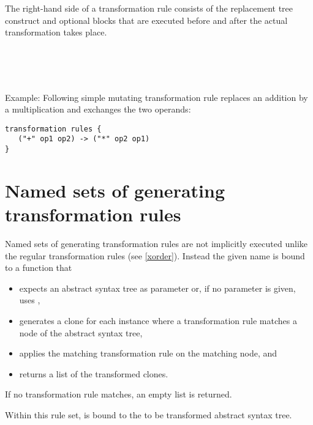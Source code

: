 \noindent
The right-hand side of a transformation rule consists of the replacement
tree construct and optional blocks that are executed before and after
the actual transformation takes place.

\begin{grammar}
      \produces {} \nextline
	  \nextline
	  \\
      \produces {} \\
      \produces {} \\
\end{grammar}

\noindent
Example: Following simple mutating transformation rule replaces
an addition by a multiplication and exchanges the two operands:

\begin{lstlisting}
transformation rules {
   ("+" op1 op2) -> ("*" op2 op1)
}
\end{lstlisting}

\section{Named sets of generating transformation rules}\label{named-trrules}

Named sets of generating transformation rules are not implicitly
executed unlike the regular transformation rules (see \ref{xorder}).
Instead the given name is bound to a function that

\begin{itemize}
   \item expects an abstract syntax tree
      as parameter or, if no parameter is given, uses ,
   \item generates a clone for each instance where a
      transformation rule matches a node of the abstract syntax tree,
   \item applies the matching transformation rule on the matching node, and
   \item returns a list of the transformed clones.
\end{itemize}

\noindent
If no transformation rule matches, an empty list is returned.

Within this rule set,  is bound to the
to be transformed abstract syntax tree.

